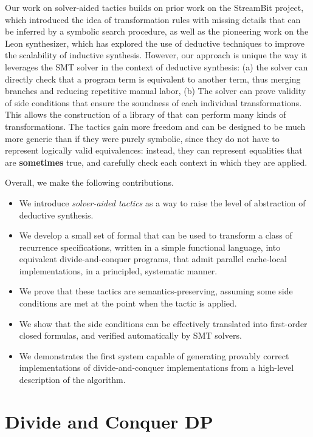 Our work on solver-aided tactics builds on prior work on the StreamBit project, which introduced the idea of transformation rules with missing details that can be inferred by a symbolic search procedure, as well as the pioneering work on the Leon synthesizer, which has explored the use of deductive techniques to improve the scalability of inductive synthesis. However, our approach is unique the way it leverages the SMT solver in the context of deductive synthesis: (a) the solver can directly check that a program term is equivalent to another term, thus merging branches and reducing repetitive manual labor, (b) The solver can prove validity of side conditions that ensure the soundness of each individual transformations. This allows the construction of a library of  that can perform many kinds of transformations. The tactics gain more freedom and can be designed to be much more generic than if they were purely symbolic, since they do not have to represent logically valid equivalences: instead, they can represent equalities that are {\bf sometimes} true, and carefully check each context in which they are applied. 

Overall, we make the following contributions.
\begin{itemize}
\item We introduce \emph{solver-aided tactics} as a way to raise the level of abstraction of deductive synthesis.
\item We develop a small set of formal  that can be used to transform a class of recurrence
  specifications, written in a simple functional language, 
  into equivalent divide-and-conquer programs, that admit parallel cache-local
  implementations, in a principled, systematic manner.
\item We prove that these tactics are semantics-preserving, assuming some side conditions are met
  at the point when the tactic is applied.
  \item We show that the side conditions can be effectively translated into first-order closed
  formulas, and verified automatically by SMT solvers.
\item We demonstrates the first system capable of generating provably correct implementations of divide-and-conquer implementations from a high-level description of the algorithm. 
\end{itemize} 

\section{Divide and Conquer DP}
\label{divide}

